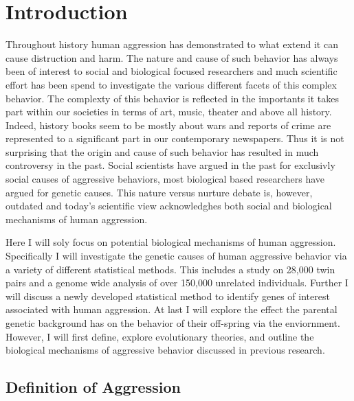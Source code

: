 \chapter{Introduction}
\label{cha:introduction}

Throughout history human aggression has demonstrated to what extend it can cause distruction and harm.
The nature and cause of such behavior has always been of interest to social and biological focused researchers and much scientific effort has been spend to investigate the various different facets of this complex behavior.
The complexty of this behavior is reflected in the importants it takes part within our societies in terms of art, music, theater and above all history.
Indeed, history books seem to be mostly about wars and reports of crime are represented to a significant part in our contemporary newspapers.
Thus it is not surprising that the origin and cause of such behavior has resulted in much controversy in the past.
Social scientists have argued in the past for exclusivly social causes of aggressive behaviors, most biological based researchers have argued for genetic causes.
This nature versus nurture debate is, however, outdated and today's scientific view acknowledghes both social and biological mechanisms of human aggression.

Here I will soly focus on potential biological mechanisms of human aggression.
Specifically I will investigate the genetic causes of human aggressive behavior via a variety of different statistical methods.
This includes a study on 28,000 twin pairs and a genome wide analysis of over 150,000 unrelated individuals.
Further I will discuss a newly developed statistical method to identify genes of interest associated with human aggression.
At last I will explore the effect the parental genetic background has on the behavior of their off-spring via the enviornment.
However, I will first define, explore evolutionary theories, and outline the biological mechanisms of aggressive behavior discussed in previous research. 

\section{Definition of Aggression}
\label{sec:overview_of_reseach_in_aggression}


